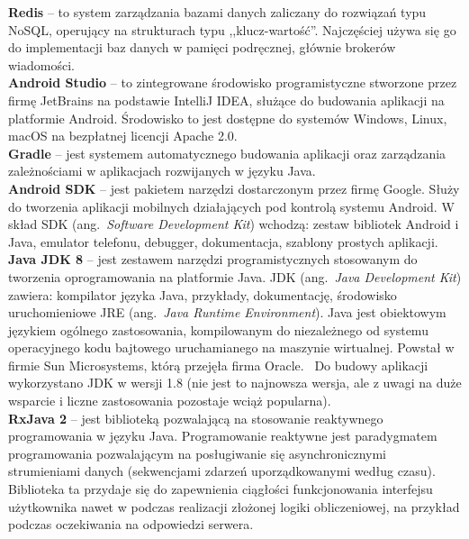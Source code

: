 \noindent\textbf{Redis} -- to system zarządzania bazami danych zaliczany do rozwiązań typu NoSQL, operujący na strukturach typu ,,klucz-wartość''. 
Najczęściej używa się go do implementacji baz danych w pamięci podręcznej, głównie brokerów wiadomości.~\cite{redis} \\

\noindent\textbf{Android Studio} -- to zintegrowane środowisko programistyczne stworzone przez firmę JetBrains na podstawie IntelliJ IDEA, służące do budowania aplikacji na platformie Android. Środowisko to jest dostępne do systemów Windows, Linux, macOS na bezpłatnej licencji Apache 2.0.~\cite{android_doc,android_studio} \\

\noindent\textbf{Gradle} -- jest systemem automatycznego budowania aplikacji oraz zarządzania zależnościami w aplikacjach rozwijanych w języku Java.~\cite{gradle,gradle_android_doc} \\

\noindent\textbf{Android SDK} -- jest pakietem narzędzi dostarczonym przez firmę Google. Służy do tworzenia aplikacji mobilnych działających pod kontrolą systemu Android. W skład SDK (ang.~\emph{Software Development Kit}) wchodzą: zestaw bibliotek Android i Java, emulator telefonu, debugger, dokumentacja, szablony prostych aplikacji.~\cite{android_studio} \\

\noindent\textbf{Java JDK 8} -- jest zestawem narzędzi programistycznych stosowanym do tworzenia oprogramowania na platformie Java. JDK (ang.~\emph{Java Development Kit}) zawiera: kompilator języka Java, przykłady, dokumentację, środowisko uruchomieniowe JRE (ang.~\emph{Java Runtime Environment}).
Java jest obiektowym językiem ogólnego zastosowania, kompilowanym do niezależnego od systemu operacyjnego kodu bajtowego uruchamianego na maszynie wirtualnej. Powstał w firmie Sun Microsystems, którą przejęła firma Oracle.~\cite{java_doc} 
Do budowy aplikacji wykorzystano JDK w wersji 1.8 (nie jest to najnowsza wersja, ale z uwagi na duże wsparcie i liczne zastosowania pozostaje wciąż popularna). \\

\noindent\textbf{RxJava 2} -- jest biblioteką pozwalającą na stosowanie reaktywnego programowania w języku Java. Programowanie reaktywne jest paradygmatem programowania pozwalającym na posługiwanie się asynchronicznymi strumieniami danych (sekwencjami zdarzeń uporządkowanymi według czasu).
Biblioteka ta przydaje się do zapewnienia ciągłości funkcjonowania interfejsu użytkownika nawet w podczas realizacji złożonej logiki obliczeniowej, na przykład podczas oczekiwania na odpowiedzi serwera. \\

